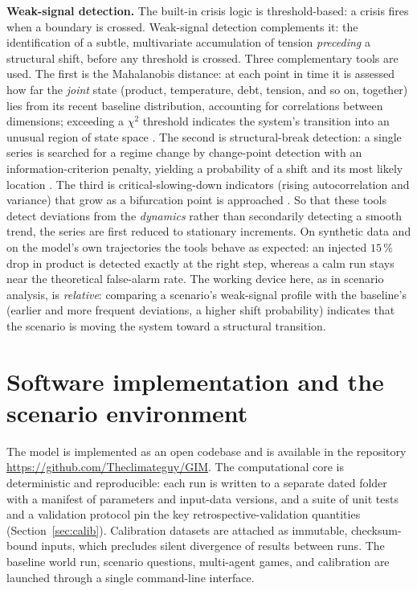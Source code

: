 \documentclass[11pt,a4paper]{article}
\begin{document}
\textbf{Weak-signal detection.} The built-in crisis logic is threshold-based: a crisis fires when a
boundary is crossed. Weak-signal detection complements it: the identification of a subtle,
multivariate accumulation of tension \emph{preceding} a structural shift, before any threshold is
crossed. Three complementary tools are used. The first is the Mahalanobis distance: at each point in
time it is assessed how far the \emph{joint} state (product, temperature, debt, tension, and so on,
together) lies from its recent baseline distribution, accounting for correlations between
dimensions; exceeding a $\chi^2$ threshold indicates the system's transition into an unusual region
of state space \citep{mahalanobis1936,wilson1931}. The second is structural-break detection: a
single series is searched for a regime change by change-point detection with an information-criterion
penalty, yielding a probability of a shift and its most likely location \citep{schwarz1978}. The
third is critical-slowing-down indicators (rising autocorrelation and variance) that grow as a
bifurcation point is approached \citep{scheffer2009}. So that these tools detect deviations from the
\emph{dynamics} rather than secondarily detecting a smooth trend, the series are first reduced to
stationary increments. On synthetic data and on the model's own trajectories the tools behave as
expected: an injected $15\,\%$ drop in product is detected exactly at the right step, whereas a calm
run stays near the theoretical false-alarm rate. The working device here, as in scenario analysis,
is \emph{relative}: comparing a scenario's weak-signal profile with the baseline's (earlier and more
frequent deviations, a higher shift probability) indicates that the scenario is moving the system
toward a structural transition.

\section{Software implementation and the scenario environment}
\label{sec:repo}

The model is implemented as an open codebase and is available in the repository
\url{https://github.com/Theclimateguy/GIM}. The computational core is deterministic and
reproducible: each run is written to a separate dated folder with a manifest of parameters and
input-data versions, and a suite of unit tests and a validation protocol pin the key
retrospective-validation quantities (Section~\ref{sec:calib}). Calibration datasets are attached as
immutable, checksum-bound inputs, which precludes silent divergence of results between runs. The
baseline world run, scenario questions, multi-agent games, and calibration are launched through a
single command-line interface.
\end{document}
